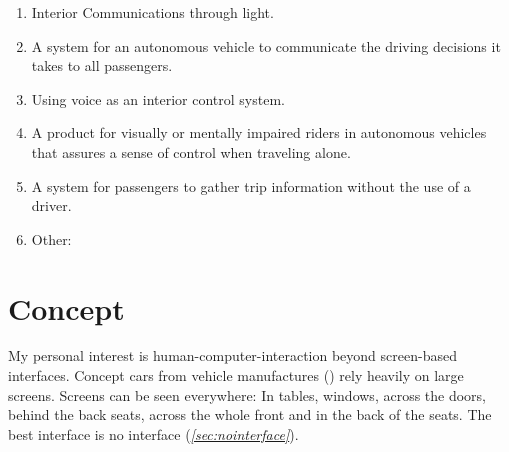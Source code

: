     \begin{enumerate}
    \item Interior Communications through light.
    \item A system for an autonomous vehicle to communicate the driving decisions it takes to all passengers.
    \item Using voice as an interior control system.
    \item A product for visually or mentally impaired riders in autonomous vehicles that assures a sense of control when traveling alone.
    \item A system for passengers to gather trip information without the use of a driver.
    \item Other:
    \end{enumerate}

\section{Concept}
\label{sec:concept}
My personal interest is human-computer-interaction beyond screen-based interfaces. Concept cars from vehicle manufactures (\emph{}) rely heavily on large screens. Screens can be seen everywhere: In tables, windows, across the doors, behind the back seats, across the whole front and in the back of the seats. The best interface is no interface (\emph{\autoref{sec:nointerface}}). 

